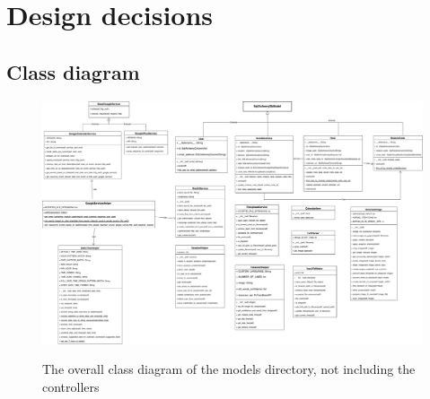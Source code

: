 \chapter{Design decisions}
\label{appendix:design}

\section{Class diagram}
\label{design:class_diagram}
\begin{figure}[H]
  \centering
  \includegraphics{images/class_diagram}
  \label{fig:class_diagram}
  \caption{The overall class diagram of the models directory, not including the controllers}
\end{figure}
